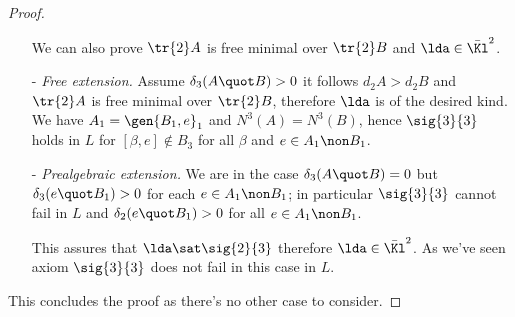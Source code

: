 \begin{proof}
\begin{itemize}
We can also prove $\tr{2}A$ is free minimal over $\tr{2}B$ and $\lda\in\bar{\Kl}^{2}$.

\item[-]\emph{Free extension.} Assume $\delta_{3}(A\quot B)>0$ it follows $d_{2}A>d_{2}B$ and
$\tr{2}A$ is free minimal over $\tr{2}B$, therefore $\lda$ is
of the desired kind. We have $A_{1}=\gen{B_{1},e}_{1}$ and $N^{3}(A)=N^{3}(B)$, hence
$\sig{3}{3}$ holds in $L$ for $[\beta,e]\notin B_{3}$ for all $\beta$ and $e\in A_{1}\non
B_{1}$.

\item[-]\emph{Prealgebraic extension.} We are in the case $\delta_{3}(A\quot B)=0$ but 
$\delta_{3}(e\quot B_{1})>0$ for each $e\in A_{1}\non B_{1}$; in particular $\sig{3}{3}$ cannot
fail in $L$ and $\delta_{2}(e\quot B_{1})>0$ for all $e\in A_{1}\non B_{1}$.

This assures that $\lda\sat\sig{2}{3}$ therefore $\lda\in\bar{\Kl}^{2}$.
As we've seen axiom $\sig{3}{3}$ does not fail in this case in $L$.
\end{itemize}
This concludes the proof as there's no other case to consider.

\end{proof}